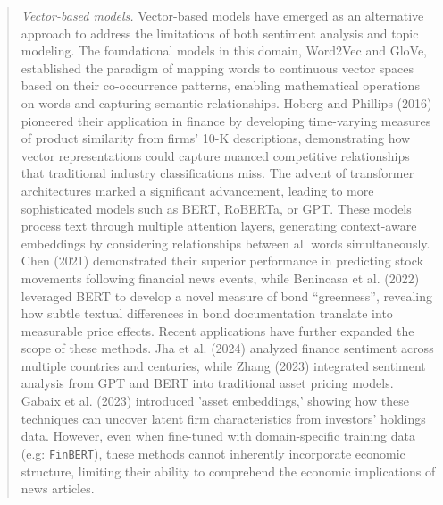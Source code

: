 \begin{quote}
\hspace{0.5cm} \textit{Vector-based models.} 
Vector-based models have emerged as an alternative approach to address the limitations of both sentiment analysis and topic modeling. The foundational models in this domain, Word2Vec and GloVe, established the paradigm of mapping words to continuous vector spaces based on their co-occurrence patterns, enabling mathematical operations on words and capturing semantic relationships.
Hoberg and Phillips (2016) pioneered their application in finance by developing time-varying measures of product similarity from firms' 10-K descriptions, demonstrating how vector representations could capture nuanced competitive relationships that traditional industry classifications miss.
%
The advent of transformer architectures marked a significant advancement, leading to more sophisticated models such as BERT, RoBERTa, or GPT. These models process text through multiple attention layers, generating context-aware embeddings by considering relationships between all words simultaneously. 
Chen (2021) demonstrated their superior performance in predicting stock movements following financial news events, while Benincasa et al. (2022) leveraged BERT to develop a novel measure of bond ``greenness'', revealing how subtle textual differences in bond documentation translate into measurable price effects.
%
Recent applications have further expanded the scope of these methods. 
Jha et al. (2024) analyzed finance sentiment across multiple countries and centuries, while Zhang (2023) integrated sentiment analysis from GPT and BERT into traditional asset pricing models. Gabaix et al. (2023) introduced 'asset embeddings,' showing how these techniques can uncover latent firm characteristics from investors' holdings data. However, even when fine-tuned with domain-specific training data (e.g: \texttt{FinBERT}), these methods cannot inherently incorporate economic structure, limiting their ability to comprehend the economic implications of news articles.
\end{quote}

